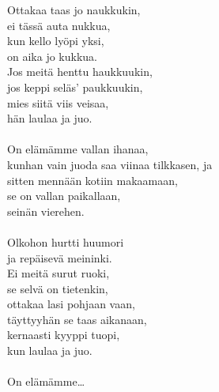  
 Ottakaa taas jo naukkukin, \\ ei tässä auta nukkua, \\ kun kello lyöpi yksi, \\ on aika jo kukkua. \\ Jos meitä henttu haukkuukin, \\ jos keppi seläs' paukkuukin, \\ mies siitä viis veisaa, \\ hän laulaa ja juo. \\ \hspace{10mm} \\ On elämämme vallan ihanaa, \\ kunhan vain juoda saa viinaa tilkkasen,  ja  \\ sitten mennään kotiin makaamaan,  \\ se on vallan paikallaan,  \\ seinän vierehen. \\ \hspace{10mm} \\ Olkohon hurtti huumori \\ ja repäisevä meininki. \\ Ei meitä surut ruoki, \\ se selvä on tietenkin, \\ ottakaa lasi pohjaan vaan, \\ täyttyyhän se taas aikanaan, \\ kernaasti kyyppi tuopi, \\ kun laulaa ja juo. \\ \hspace{10mm} \\ On elämämme\dots